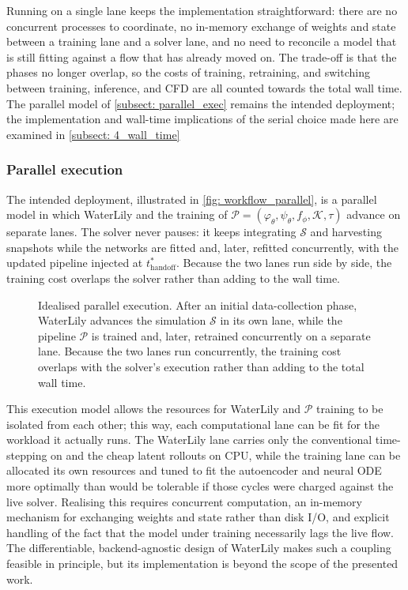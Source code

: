  Running on a single lane keeps the implementation straightforward: there are no concurrent processes to coordinate, no in-memory exchange of weights and state between a training lane and a solver lane, and no need to reconcile a model that is still fitting against a flow that has already moved on. The trade-off is that the phases no longer overlap, so the costs of training, retraining, and switching between training, inference, and CFD are all counted towards the total wall time. The parallel model of \autoref{subsect: parallel_exec} remains the intended deployment; the implementation and wall-time implications of the serial choice made here are examined in \autoref{subsect: 4_wall_time}

\subsubsection{Parallel execution}
\label{subsect: parallel_exec}

The intended deployment, illustrated in \autoref{fig: workflow_parallel}, is a parallel model in which WaterLily and the training of $\mathcal{P} = (\varphi_\theta, \psi_\theta, f_\phi, \mathcal{K}, \tau)$ advance on separate lanes. The solver never pauses: it keeps integrating $\mathcal{S}$ and harvesting snapshots while the networks are fitted and, later, refitted concurrently, with the updated pipeline injected at $t^*_\text{handoff}$. Because the two lanes run side by side, the training cost overlaps the solver rather than adding to the wall time.

\begin{figure}[htbp]
    \centering
    
    \caption{Idealised parallel execution. After an initial data-collection phase, WaterLily advances the simulation $\mathcal{S}$ in its own lane, while the pipeline $\mathcal{P}$ is trained and, later, retrained concurrently on a separate lane. Because the two lanes run concurrently, the training cost overlaps with the solver's execution rather than adding to the total wall time.}    
    \label{fig: workflow_parallel}
\end{figure}

This execution model allows the resources for WaterLily and $\mathcal{P}$ training to be isolated from each other; this way, each computational lane can be fit for the workload it actually runs. The WaterLily lane carries only the conventional time-stepping on and the cheap latent rollouts on CPU, while the training lane can be allocated its own resources and tuned to fit the autoencoder and neural ODE more optimally than would be tolerable if those cycles were charged against the live solver. Realising this requires concurrent computation, an in-memory mechanism for exchanging weights and state rather than disk I/O, and explicit handling of the fact that the model under training necessarily lags the live flow. The differentiable, backend-agnostic design of WaterLily makes such a coupling feasible in principle, but its implementation is beyond the scope of the presented work.


